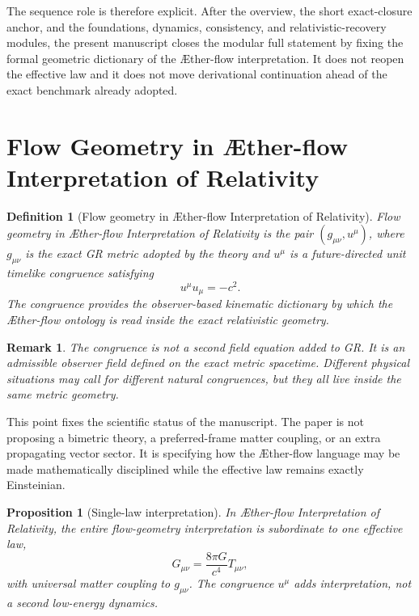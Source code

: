 \documentclass[11pt]{article}
\newcommand{\Aflow}{\AE{}ther-flow}
\newcommand{\TheoryName}{\Aflow{} Interpretation of Relativity}
\newtheorem{definition}{Definition}
\newtheorem{proposition}{Proposition}
\newtheorem{remark}{Remark}
\begin{document}
The sequence role is therefore explicit. After the overview, the short exact-closure anchor, and the foundations, dynamics, consistency, and relativistic-recovery modules, the present manuscript closes the modular full statement by fixing the formal geometric dictionary of the \Aflow{} interpretation. It does not reopen the effective law and it does not move derivational continuation ahead of the exact benchmark already adopted.

\section{Flow Geometry in \TheoryName{}}

\begin{definition}[Flow geometry in \TheoryName{}]
Flow geometry in \TheoryName{} is the pair \((g_{\mu\nu},u^\mu)\), where \(g_{\mu\nu}\) is the exact GR metric adopted by the theory and \(u^\mu\) is a future-directed unit timelike congruence satisfying
\begin{equation}
u^\mu u_\mu = -c^2.
\label{eq:unitnorm}
\end{equation}
The congruence provides the observer-based kinematic dictionary by which the \Aflow{} ontology is read inside the exact relativistic geometry.
\end{definition}

\begin{remark}
The congruence is not a second field equation added to GR. It is an admissible observer field defined on the exact metric spacetime. Different physical situations may call for different natural congruences, but they all live inside the same metric geometry.
\end{remark}

This point fixes the scientific status of the manuscript. The paper is not proposing a bimetric theory, a preferred-frame matter coupling, or an extra propagating vector sector. It is specifying how the \Aflow{} language may be made mathematically disciplined while the effective law remains exactly Einsteinian.

\begin{proposition}[Single-law interpretation]
In \TheoryName{}, the entire flow-geometry interpretation is subordinate to one effective law,
\begin{equation}
G_{\mu\nu}=\frac{8\pi G}{c^4}T_{\mu\nu},
\label{eq:einstein}
\end{equation}
with universal matter coupling to \(g_{\mu\nu}\). The congruence \(u^\mu\) adds interpretation, not a second low-energy dynamics.
\end{proposition}
\end{document}
